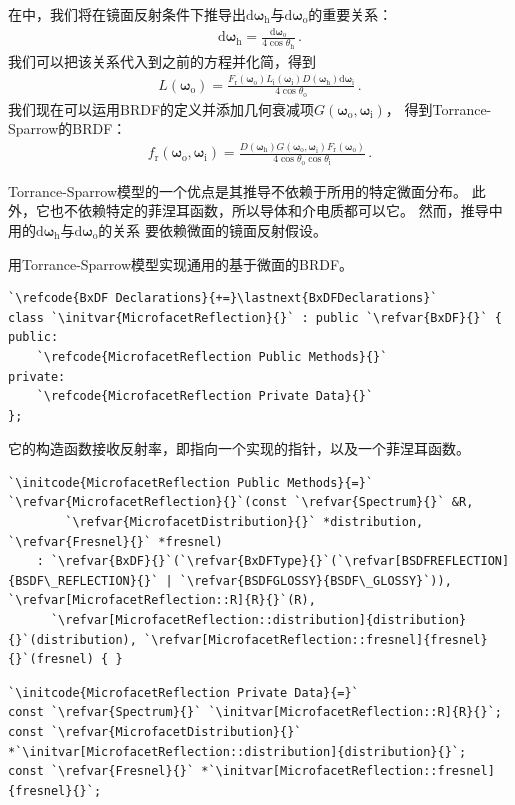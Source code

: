 在中，我们将在镜面反射条件下推导出$\mathrm{d}{\bm\omega}_{\mathrm{h}}$与$\mathrm{d}{\bm\omega}_{\mathrm{o}}$的重要关系：
\begin{align}\label{eq:8.17}
    \mathrm{d}{\bm\omega}_{\mathrm{h}}=\frac{\mathrm{d}{\bm\omega}_{\mathrm{o}}}{4\cos\theta_{\mathrm{h}}}\, .
\end{align}
我们可以把该关系代入到之前的方程并化简，得到
\begin{align*}
    L({\bm\omega}_{\mathrm{o}})=\frac{F_{\mathrm{r}}({\bm\omega}_{\mathrm{o}})
    L_{\mathrm{i}}({\bm\omega}_{\mathrm{i}})D({\bm\omega}_{\mathrm{h}})\mathrm{d}{\bm\omega}_{\mathrm{i}}}
    {4\cos\theta_{\mathrm{o}}}\, .
\end{align*}
我们现在可以运用BRDF的定义并添加几何衰减项$G({\bm\omega}_{\mathrm{o}},{\bm\omega}_{\mathrm{i}})$，
得到Torrance-Sparrow的BRDF：
\begin{align}\label{eq:8.18}
    f_{\mathrm{r}}({\bm\omega}_{\mathrm{o}},{\bm\omega}_{\mathrm{i}})=
    \frac{D({\bm\omega}_{\mathrm{h}})G({\bm\omega}_{\mathrm{o}},{\bm\omega}_{\mathrm{i}})
    F_{\mathrm{r}}({\bm\omega}_{\mathrm{o}})}{4\cos\theta_{\mathrm{o}}\cos\theta_{\mathrm{i}}}\, .
\end{align}

Torrance-Sparrow模型的一个优点是其推导不依赖于所用的特定微面分布。
此外，它也不依赖特定的菲涅耳函数，所以导体和介电质都可以它。
然而，推导中用的$\mathrm{d}{\bm\omega}_{\mathrm{h}}$与$\mathrm{d}{\bm\omega}_{\mathrm{o}}$的关系
要依赖微面的镜面反射假设。

用Torrance-Sparrow模型实现通用的基于微面的BRDF。
\begin{lstlisting}
`\refcode{BxDF Declarations}{+=}\lastnext{BxDFDeclarations}`
class `\initvar{MicrofacetReflection}{}` : public `\refvar{BxDF}{}` {
public:
    `\refcode{MicrofacetReflection Public Methods}{}`
private:
    `\refcode{MicrofacetReflection Private Data}{}`
};
\end{lstlisting}
它的构造函数接收反射率，即指向一个实现的指针，以及一个菲涅耳函数。
\begin{lstlisting}
`\initcode{MicrofacetReflection Public Methods}{=}`
`\refvar{MicrofacetReflection}{}`(const `\refvar{Spectrum}{}` &R,
        `\refvar{MicrofacetDistribution}{}` *distribution, `\refvar{Fresnel}{}` *fresnel)
    : `\refvar{BxDF}{}`(`\refvar{BxDFType}{}`(`\refvar[BSDFREFLECTION]{BSDF\_REFLECTION}{}` | `\refvar{BSDFGLOSSY}{BSDF\_GLOSSY}`)), `\refvar[MicrofacetReflection::R]{R}{}`(R),
      `\refvar[MicrofacetReflection::distribution]{distribution}{}`(distribution), `\refvar[MicrofacetReflection::fresnel]{fresnel}{}`(fresnel) { }
\end{lstlisting}
\begin{lstlisting}
`\initcode{MicrofacetReflection Private Data}{=}`
const `\refvar{Spectrum}{}` `\initvar[MicrofacetReflection::R]{R}{}`;
const `\refvar{MicrofacetDistribution}{}` *`\initvar[MicrofacetReflection::distribution]{distribution}{}`;
const `\refvar{Fresnel}{}` *`\initvar[MicrofacetReflection::fresnel]{fresnel}{}`;
\end{lstlisting}

